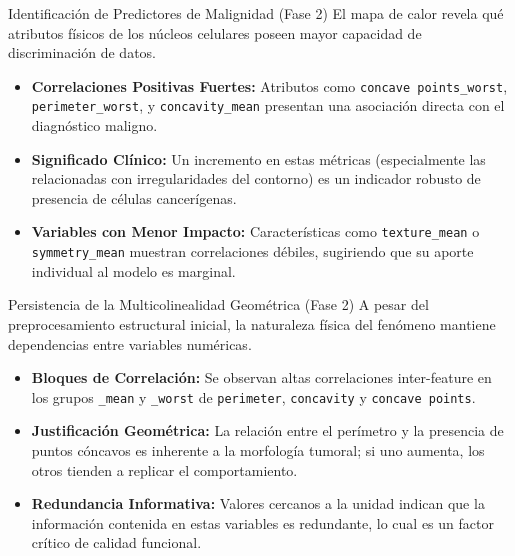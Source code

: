 \documentclass{beamer}
\begin{document}
	\begin{frame}{Identificación de Predictores de Malignidad (Fase 2)}
		El mapa de calor revela qué atributos físicos de los núcleos celulares poseen mayor capacidad de discriminación de datos.
		
		\begin{itemize}
			\item<2-> \textbf{Correlaciones Positivas Fuertes:} Atributos como \texttt{concave points\_worst}, \texttt{perimeter\_worst}, y \texttt{concavity\_mean} presentan una asociación directa con el diagnóstico maligno.
			\item<3-> \textbf{Significado Clínico:} Un incremento en estas métricas (especialmente las relacionadas con irregularidades del contorno) es un indicador robusto de presencia de células cancerígenas.
			\item<4-> \textbf{Variables con Menor Impacto:} Características como \texttt{texture\_mean} o \texttt{symmetry\_mean} muestran correlaciones débiles, sugiriendo que su aporte individual al modelo es marginal.
		\end{itemize}
	\end{frame}
	
	\begin{frame}{Persistencia de la Multicolinealidad Geométrica (Fase 2)}
		A pesar del preprocesamiento estructural inicial, la naturaleza física del fenómeno mantiene dependencias entre variables numéricas.
		
		\begin{itemize}
			\item<2-> \textbf{Bloques de Correlación:} Se observan altas correlaciones inter-feature en los grupos \texttt{\_mean} y \texttt{\_worst} de \texttt{perimeter}, \texttt{concavity} y \texttt{concave points}.
			\item<3-> \textbf{Justificación Geométrica:} La relación entre el perímetro y la presencia de puntos cóncavos es inherente a la morfología tumoral; si uno aumenta, los otros tienden a replicar el comportamiento.
			\item<4-> \textbf{Redundancia Informativa:} Valores cercanos a la unidad indican que la información contenida en estas variables es redundante, lo cual es un factor crítico de calidad funcional.
		\end{itemize}
	\end{frame}
	
\end{document}

